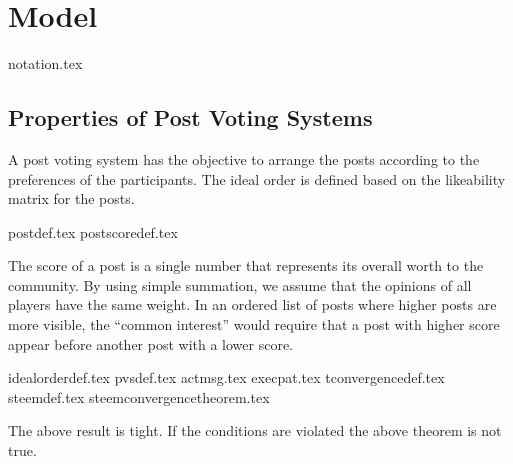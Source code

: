\section{Model}
  {notation.tex}
  \subsection{Properties of Post Voting Systems}
    A post voting system has the objective to arrange the posts according to the
    preferences of the participants. The ideal order is defined based on the
    likeability matrix for the posts.

    {postdef.tex}
    {postscoredef.tex}

    The score of a post is a single number that represents its overall worth to
    the community. By using simple summation, we assume that the opinions of all
    players have the same weight. In an ordered list of posts where higher posts
    are more visible, the ``common interest'' would require that a post with
    higher score appear before another post with a lower score.

    {idealorderdef.tex}
    {pvsdef.tex}
    {actmsg.tex}
    {execpat.tex}
    {tconvergencedef.tex}
    {steemdef.tex}
    {steemconvergencetheorem.tex}

    The above result is tight.
    If the conditions are violated the above theorem is not true.
